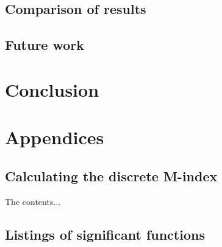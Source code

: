 \documentclass[a4paper,12pt]{report}
\numberwithin{equation}{chapter}
\begin{document}
\section{Comparison of results}

\section{Future work}


\chapter{Conclusion} \label{chap:conclusion}
\vspace{-1cm}





\newpage
\appendix
\chapter{Appendices}

\section{Calculating the discrete M-index} \label{App:M-index_calc}
The contents...

\section{Listings of significant functions}
\end{document}
